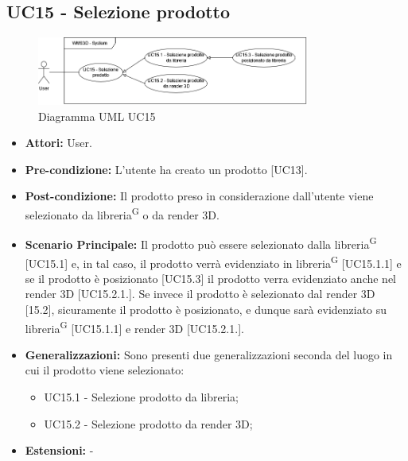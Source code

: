 \subsection{UC15 - Selezione prodotto}
\begin{figure}[H]
  \centering
  \includegraphics[width=0.8\textwidth]{UC_diagrams_11-20/UC15_sys.drawio.png}
   \caption{Diagramma UML UC15}
\end{figure}
\begin{itemize}
    \item \textbf{Attori:} User.
    \item \textbf{Pre-condizione:}  L'utente ha creato un prodotto [UC13].
    \item \textbf{Post-condizione:} Il prodotto preso in considerazione dall'utente viene selezionato da libreria\textsuperscript{G} o da render 3D.
    \item \textbf{Scenario Principale:} Il prodotto può essere selezionato dalla libreria\textsuperscript{G} [UC15.1] e, in tal caso, il prodotto verrà evidenziato in libreria\textsuperscript{G} [UC15.1.1] e se il prodotto è posizionato [UC15.3] il prodotto verra evidenziato anche nel render 3D [UC15.2.1.]. Se invece il prodotto è selezionato dal render 3D [15.2], sicuramente il prodotto è posizionato, e dunque sarà evidenziato su libreria\textsuperscript{G} [UC15.1.1] e render 3D [UC15.2.1.].
    \item \textbf{Generalizzazioni:} Sono presenti due generalizzazioni seconda del luogo in cui il prodotto viene selezionato:
    \begin{itemize}
        \item UC15.1 - Selezione prodotto da libreria;
        \item UC15.2 - Selezione prodotto da render 3D;
    \end{itemize}
    \item \textbf{Estensioni:} -
\end{itemize}


